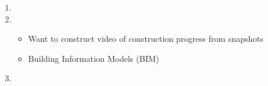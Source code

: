 \documentclass[12pt]{article}
\begin{document}
\begin{enumerate}
\item {}

\item {}
\begin{itemize}
	\item Want to construct video of construction progress from snapshots
	\item Building Information Models (BIM) 
\end{itemize}

\item {}

\end{enumerate}
\end{document}
